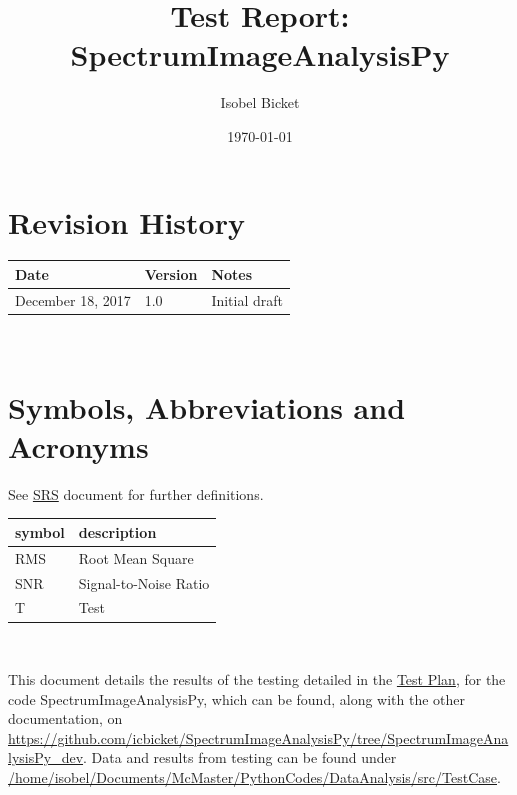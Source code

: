 \documentclass[12pt, titlepage]{article}
\newcommand{\progname}{SpectrumImageAnalysisPy}
\begin{document}
\title{Test Report: SpectrumImageAnalysisPy} 
\author{Isobel Bicket}
\date{\today}
	
\maketitle


\section{Revision History}

\begin{tabularx}{\textwidth}{p{4cm}p{2cm}X}
\toprule {\bf Date} & {\bf Version} & {\bf Notes}\\
\midrule
December 18, 2017 & 1.0 & Initial draft\\
\bottomrule
\end{tabularx}

~\newpage

\section{Symbols, Abbreviations and Acronyms}
See \hyperref[Doc:SRS]{SRS} document for further definitions.\\

\renewcommand{\arraystretch}{1.2}
\begin{tabular}{l l} 
  \toprule		
  \textbf{symbol} & \textbf{description}\\
  \midrule 
  RMS & Root Mean Square\\
  SNR & Signal-to-Noise Ratio\\
  T & Test\\
  \bottomrule
\end{tabular}\\


\newpage

\tableofcontents

\listoftables %

\listoffigures %

\newpage


This document details the results of the testing detailed in the
\hyperref[Doc:TestPlan]{Test Plan}, for the code \progname, which can be found,
along with the other documentation, on
\url{https://github.com/icbicket/SpectrumImageAnalysisPy/tree/SpectrumImageAnalysisPy_dev}. 
Data and results from testing can be found under 
\url{/home/isobel/Documents/McMaster/PythonCodes/DataAnalysis/src/TestCase}.
\end{document}
